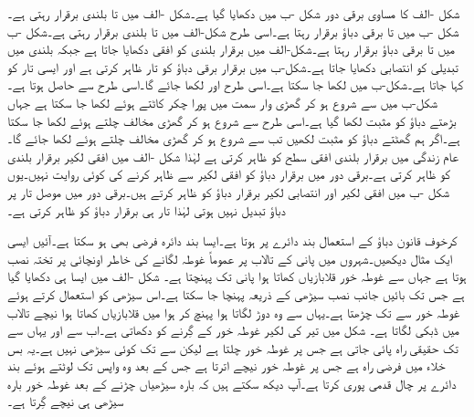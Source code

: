 شکل -الف کا مساوی برقی دور شکل -ب میں دکھایا گیا ہے۔شکل -الف میں  تا  بلندی برقرار رہتی ہے۔شکل -ب میں  تا  برقی دباؤ برقرار رہتا ہے۔اسی طرح شکل-الف میں   تا  بلندی برقرار رہتی ہے۔شکل -ب میں  تا  برقی دباؤ برقرار رہتا ہے۔شکل-الف میں برقرار بلندی کو افقی دکھایا جاتا ہے جبکہ بلندی میں تبدیلی کو انتصابی دکھایا جاتا ہے۔شکل-ب میں برقرار برقی دباؤ کو تار ظاہر کرتی ہے اور ایسی تار کو  کہا جاتا ہے۔شکل-ب میں  لکھا جا سکتا ہے۔اسی طرح  اور  لکھا جائے گا۔اسی طرح  سے  حاصل ہوتا ہے۔شکل-ب میں  سے شروع ہو کر گھڑی وار سمت میں پورا چکر کاٹتے ہوئے   لکھا جا سکتا ہے جہاں بڑھتے دباؤ کو مثبت لکھا گیا ہے۔اسی طرح  سے شروع ہو کر گھڑی مخالف چلتے ہوئے  لکھا جا سکتا ہے۔اگر ہم گھٹتے دباؤ کو مثبت لکھیں تب   سے شروع ہو کر گھڑی مخالف چلتے ہوئے  لکھا جائے گا۔عام زندگی میں برقرار بلندی افقی سطح کو ظاہر کرتی ہے لہٰذا شکل -الف میں افقی لکیر برقرار بلندی کو ظاہر کرتی ہے۔برقی دور میں برقرار دباؤ کو افقی لکیر سے ظاہر کرنے کی کوئی روایت نہیں۔یوں شکل -ب میں افقی لکیر  اور انتصابی  لکیر  برقرار دباؤ کو ظاہر کرتے ہیں۔برقی دور میں موصل تار پر  دباؤ تبدیل نہیں ہوتی لہٰذا تار ہی برقرار دباؤ کو ظاہر کرتی ہے۔

کرخوف قانون دباؤ کے استعمال بند دائرے پر ہوتا ہے۔ایسا بند دائرہ فرضی بھی ہو سکتا ہے۔آئیں ایسی ایک مثال دیکھیں۔شہروں میں پانی کے تالاب  پر عموماً غوطہ لگانے کی خاطر اونچائی پر تختہ نصب ہوتا ہے جہاں سے غوطہ خور قلابازیاں کھاتا ہوا پانی تک پہنچتا ہے۔ شکل -الف میں ایسا ہی  دکھایا گیا ہے جس تک بائیں جانب نصب سیڑھی کے ذریعہ پہنچا جا سکتا ہے۔اس سیڑھی کو استعمال کرتے ہوئے غوطہ خور  سے  تک چڑھتا ہے۔یہاں سے وہ دوڑ لگاتا ہوا  پہنچ کر ہوا میں قلابازیاں کھاتا ہوا نیچے تالاب میں ڈبکی لگاتا ہے۔ شکل میں تیر کی لکیر غوطہ خور کے گِرنے کو دکھاتی ہے۔اب  سے  اور یہاں سے  تک حقیقی راہ پائی جاتی ہے جس پر غوطہ خور چلتا ہے لیکن  سے  تک کوئی سیڑھی نہیں ہے۔یہ بس خلاء میں فرضی راہ ہے جس پر غوطہ خور نیچے اترتا ہے جس کے بعد وہ واپس  تک لوٹتے ہوئے بند دائرے پر چال قدمی پوری کرتا ہے۔آپ دیکھ سکتے ہیں کہ بارہ سیڑھیاں چڑنے کے بعد غوطہ خور بارہ سیڑھی ہی نیچے گِرتا ہے۔


